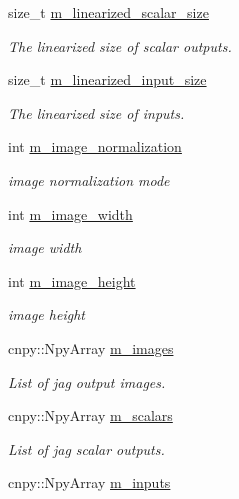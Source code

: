 \begin{DoxyCompactItemize}
size\+\_\+t \hyperlink{classlbann_1_1data__reader__jag_a856b4b9cdf9d8569e5fef1d5d996870d}{m\+\_\+linearized\+\_\+scalar\+\_\+size}
\begin{DoxyCompactList}\small\item\em The linearized size of scalar outputs. \end{DoxyCompactList}\item 
size\+\_\+t \hyperlink{classlbann_1_1data__reader__jag_a75e3c8870f9fc8e50fb24e4515ac7d82}{m\+\_\+linearized\+\_\+input\+\_\+size}
\begin{DoxyCompactList}\small\item\em The linearized size of inputs. \end{DoxyCompactList}\item 
int \hyperlink{classlbann_1_1data__reader__jag_a351fe7aaccf8456fa97c9d9bf3dcd73d}{m\+\_\+image\+\_\+normalization}
\begin{DoxyCompactList}\small\item\em image normalization mode \end{DoxyCompactList}\item 
int \hyperlink{classlbann_1_1data__reader__jag_a193a91f2aab9f6373a7b376ff183cd0e}{m\+\_\+image\+\_\+width}
\begin{DoxyCompactList}\small\item\em image width \end{DoxyCompactList}\item 
int \hyperlink{classlbann_1_1data__reader__jag_a6178d5dffd5e9bf7cf5703613cf9bd2e}{m\+\_\+image\+\_\+height}
\begin{DoxyCompactList}\small\item\em image height \end{DoxyCompactList}\item 
cnpy\+::\+Npy\+Array \hyperlink{classlbann_1_1data__reader__jag_ae96696fb14653ef1b57936943eb6a800}{m\+\_\+images}
\begin{DoxyCompactList}\small\item\em List of jag output images. \end{DoxyCompactList}\item 
cnpy\+::\+Npy\+Array \hyperlink{classlbann_1_1data__reader__jag_ab0ce0a57903e79f029e91356db8b5441}{m\+\_\+scalars}
\begin{DoxyCompactList}\small\item\em List of jag scalar outputs. \end{DoxyCompactList}\item 
cnpy\+::\+Npy\+Array \hyperlink{classlbann_1_1data__reader__jag_aa3ae2023ad77d767e717a24b91dbd548}{m\+\_\+inputs}

\end{DoxyCompactItemize}
